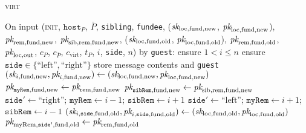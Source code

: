 \begin{center}
\begin{processbox}{\textsc{virt}}
\begin{algorithmic}[1]
      \State {}
      \State On input (\textsc{init}, $\texttt{host}_P$, $\bar{P}$,
      \texttt{sibling}, \texttt{fundee}, ($\textit{sk}_{\mathrm{loc}, \mathrm{fund},
      \mathrm{new}}$, $\textit{pk}_{\mathrm{loc}, \mathrm{fund}, \mathrm{new}}$),
      $\textit{pk}_{\mathrm{rem}, \mathrm{fund}, \mathrm{new}}$, $\textit{pk}_{\mathrm{sib},
      \mathrm{rem}, \mathrm{fund}, \mathrm{new}}$, ($\textit{sk}_{\mathrm{loc},
      \mathrm{fund}, \mathrm{old}}$, $\textit{pk}_{\mathrm{loc}, \mathrm{fund},
      \mathrm{old}}$), $\textit{pk}_{\mathrm{rem}, \mathrm{fund}, \mathrm{old}}$,
      $\textit{pk}_{\mathrm{loc}, \mathrm{out}}$, $c_P$, $c_{\bar{P}}$,
      $c_{\mathrm{virt}}$, $t_P$, $i$, \texttt{side}, $n$) by \texttt{guest}:
      \label{code:virtual-layer:keys:init}
      \Indent
        \State ensure $1 < i \leq n$ 
        \label{code:virtual-layer:keys:init:check-i}
        \State ensure $\texttt{side} \in \{\text{``left''},
        \text{``right''}\}$
        \State store message contents and \texttt{guest}
        \State $(\textit{sk}_{i, \mathrm{fund}, \mathrm{new}}, \textit{pk}_{i, \mathrm{fund},
        \mathrm{new}}) \gets (\textit{sk}_{\mathrm{loc}, \mathrm{fund}, \mathrm{new}},
        \textit{pk}_{\mathrm{loc}, \mathrm{fund}, \mathrm{new}})$
        \State $\textit{pk}_{\texttt{myRem}, \mathrm{fund}, \mathrm{new}} \gets
        \textit{pk}_{\mathrm{rem}, \mathrm{fund}, \mathrm{new}}$
         
          \State $\textit{pk}_{\texttt{sibRem}, \mathrm{fund}, \mathrm{new}} \gets
          \textit{pk}_{\mathrm{sib}, \mathrm{rem}, \mathrm{fund}, \mathrm{new}}$
        \EndIf
          \State $\texttt{side}' \gets \text{``right''}$; $\texttt{myRem}
          \gets i-1$; $\texttt{sibRem} \gets i+1$
        \Else \: 
          \State $\texttt{side}' \gets \text{``left''}$; $\texttt{myRem} \gets
          i+1$; $\texttt{sibRem} \gets i-1$
        \EndIf
        \State $(\textit{sk}_{i, \texttt{side}, \mathrm{fund}, \mathrm{old}}, \textit{pk}_{i,
        \texttt{side}, \mathrm{fund}, \mathrm{old}}) \gets (\textit{sk}_{\mathrm{loc},
        \mathrm{fund}, \mathrm{old}}, \textit{pk}_{\mathrm{loc}, \mathrm{fund},
        \mathrm{old}})$
        \State $\textit{pk}_{\mathrm{myRem}, \texttt{side}', \mathrm{fund}, \mathrm{old}}
        \gets \textit{pk}_{\mathrm{rem}, \mathrm{fund}, \mathrm{old}}$

\end{algorithmic}
\end{processbox}
\end{center}
